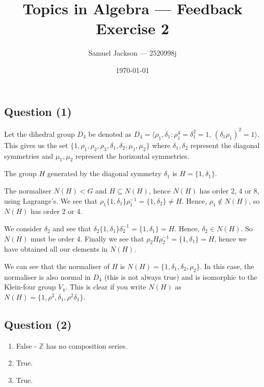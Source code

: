 \documentclass{article}
\title{Topics in Algebra  --- Feedback Exercise 2}
\author{Samuel Jackson --- 2520998j}
\date{\today}
\begin{document}
\maketitle

\begin{center}
\section*{Question (1)}
\end{center}

\begin{flushleft}
    Let the dihedral group $D_4$ be denoted as $D_4 = \langle \rho_1, \delta_1 : \rho_1^4 = \delta_1^2 = 1, \, (\delta_1 \rho_1)^2 = 1 \rangle$. This gives us the set $\{1, \rho_1, \rho_2, \rho_3, \delta_1, \delta_2, \mu_1, \mu_2\}$ where $\delta_1, \delta_2$ represent the diagonal symmetries and $\mu_1, \mu_2$ represent the horizontal symmetries. \newline

    The group $H$ generated by the diagonal symmetry $\delta_1$ is $H = \{1, \delta_1\}$. 

    The normaliser $N(H) < G$ and $H \subseteq N(H)$, hence $N(H)$ has order 2, 4 or 8, using Lagrange's. We see that $\rho_1\{1, \delta_1\}\rho_1^{-1} = \{1, \delta_2\} \neq H$. Hence, $\rho_1 \notin N(H)$, so $N(H)$ has order 2 or 4. \newline

    We consider $\delta_2$ and see that $\delta_2\{1, \delta_1\}\delta_2^{-1} = \{1, \delta_1\} = H$. Hence, $\delta_2 \in N(H)$. So $N(H)$ must be order 4. Finally we see that $\rho_2H\rho_2^{-1} = \{1, \delta_1\} = H$, hence we have obtained all our elements in $N(H)$. \newline

    
    We can see that the normaliser of $H$ is $N(H) = \{1, \delta_1, \delta_2, \rho_2\}$. In this case, the normaliser is also normal in $D_4$ (this is not always true) and is isomorphic to the Klein-four group $V_4$. This is clear if you write $N(H)$ as $N(H) = \{1, \rho^2, \delta_1, \rho^2\delta_1\}$.
\end{flushleft}
\begin{center}
\section*{Question (2)}
\end{center}

\begin{flushleft}
    \begin{enumerate}[label=\roman*)]
        \item False - $\mathbb{Z}$ has no composition series.
        \item True.
        \item True.
    \end{enumerate}

\end{flushleft}
\end{document}
